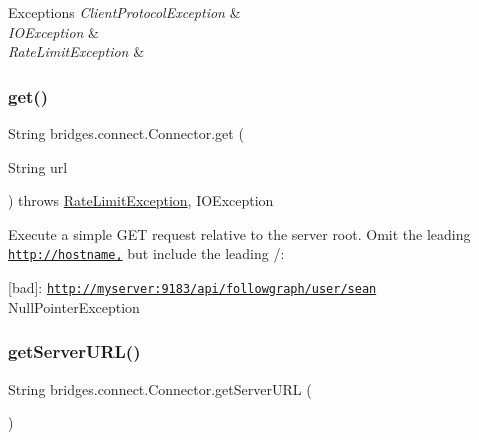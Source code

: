 \begin{DoxyExceptions}{Exceptions}
{\em Client\+Protocol\+Exception} & \\
\hline
{\em I\+O\+Exception} & \\
\hline
{\em Rate\+Limit\+Exception} & \\
\hline
\end{DoxyExceptions}
\mbox{\label{classbridges_1_1connect_1_1_connector_aec8d54bf707c50d6f8173a0c1640fcd5}} 
\subsubsection{\texorpdfstring{get()}{get()}}
{\footnotesize\ttfamily String bridges.\+connect.\+Connector.\+get (\begin{DoxyParamCaption}\item[{String}]{url }\end{DoxyParamCaption}) throws \mbox{\hyperlink{classbridges_1_1validation_1_1_rate_limit_exception}{Rate\+Limit\+Exception}}, I\+O\+Exception}

Execute a simple G\+ET request relative to the server root. Omit the leading \href{http://hostname,}{\tt http\+://hostname,} but include the leading /\+:

\mbox{[}bad\mbox{]}\+: \href{http://myserver:9183/api/followgraph/user/sean}{\tt http\+://myserver\+:9183/api/followgraph/user/sean} Null\+Pointer\+Exception \mbox{\label{classbridges_1_1connect_1_1_connector_a0b9809180aac96a83e31e224ab5ed6ec}} 
\subsubsection{\texorpdfstring{get\+Server\+U\+R\+L()}{getServerURL()}}
{\footnotesize\ttfamily String bridges.\+connect.\+Connector.\+get\+Server\+U\+RL (\begin{DoxyParamCaption}{ }\end{DoxyParamCaption})}

